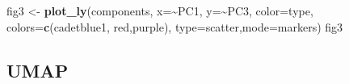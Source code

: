 \documentclass[
]{article}
\newenvironment{Shaded}{\begin{snugshade}}{\end{snugshade}}
\newcommand{\AttributeTok}[1]{\textcolor[rgb]{0.13,0.29,0.53}{#1}}
\newcommand{\FunctionTok}[1]{\textcolor[rgb]{0.13,0.29,0.53}{\textbf{#1}}}
\newcommand{\NormalTok}[1]{#1}
\newcommand{\OtherTok}[1]{\textcolor[rgb]{0.56,0.35,0.01}{#1}}
\newcommand{\SpecialCharTok}[1]{\textcolor[rgb]{0.81,0.36,0.00}{\textbf{#1}}}
\newcommand{\StringTok}[1]{\textcolor[rgb]{0.31,0.60,0.02}{#1}}
\begin{document}
\begin{Shaded}
\begin{Highlighting}[]
\NormalTok{fig3 }\OtherTok{\textless{}{-}} \FunctionTok{plot\_ly}\NormalTok{(components, }\AttributeTok{x=}\SpecialCharTok{\textasciitilde{}}\NormalTok{PC1, }\AttributeTok{y=}\SpecialCharTok{\textasciitilde{}}\NormalTok{PC3, }
                \AttributeTok{color=}\NormalTok{type, }\AttributeTok{colors=}\FunctionTok{c}\NormalTok{(}\StringTok{\textquotesingle{}cadetblue1\textquotesingle{}}\NormalTok{, }\StringTok{\textquotesingle{}red\textquotesingle{}}\NormalTok{,}\StringTok{\textquotesingle{}purple\textquotesingle{}}\NormalTok{),}
                \AttributeTok{type=}\StringTok{\textquotesingle{}scatter\textquotesingle{}}\NormalTok{,}\AttributeTok{mode=}\StringTok{\textquotesingle{}markers\textquotesingle{}}\NormalTok{)}
\NormalTok{fig3}
\end{Highlighting}
\end{Shaded}

\subsection{UMAP}\label{umap}
\end{document}
